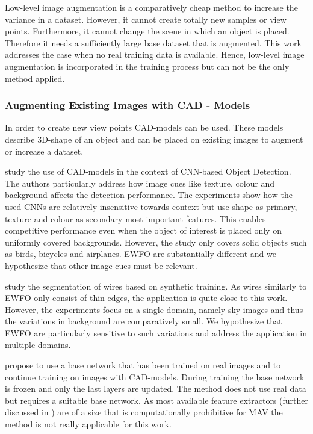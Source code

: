 Low-level image augmentation is a comparatively cheap method to increase the variance in a dataset. However, it cannot create totally new samples or view points. Furthermore, it cannot change the scene in which an object is placed. Therefore it needs a sufficiently large base dataset that is augmented. This work addresses the case when no real training data is available. Hence, low-level image augmentation is incorporated in the training process but can not be the only method applied.

\subsubsection{Augmenting Existing Images with CAD - Models}

In order to create new view points \ac{CAD}-models can be used. These models describe 3D-shape of an object and can be placed on existing images to augment or increase a dataset.

\citeauthor{Peng}\cite{Peng} study the use of \ac{CAD}-models in the context of \ac{CNN}-based Object Detection. The authors particularly address how image cues like texture, colour and background affects the detection performance. The experiments show how the used \acp{CNN} are relatively insensitive towards context but use shape as primary, texture and colour as secondary most important features. This enables competitive performance even when the object of interest is placed only on uniformly covered backgrounds. However, the study only covers solid objects such as birds, bicycles and airplanes. \ac{EWFO} are substantially different and we hypothesize that other image cues must be relevant.

\citeauthor{Madaan2017}\cite{Madaan2017} study the segmentation of wires based on synthetic training. As wires similarly to \ac{EWFO} only consist of thin edges, the application is quite close to this work. However, the experiments focus on a single domain, namely sky images and thus the variations in background are comparatively small. We hypothesize that \ac{EWFO} are particularly sensitive to such variations and address the application in multiple domains.

\citeauthor{Hinterstoisser2017} \cite{Hinterstoisser2017} propose to use a base network that has been trained on real images and to continue training on images with \ac{CAD}-models. During training the base network is frozen and only the last layers are updated. The method does not use real data but requires a suitable base network. As most available feature extractors (further discussed in ) are of a size that is computationally prohibitive for \ac{MAV} the method is not really applicable for this work. 

